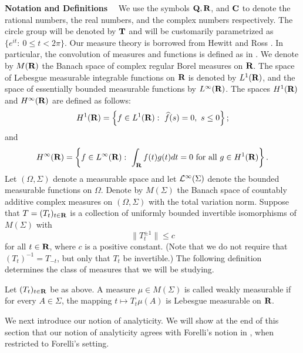 
\bigskip
\noindent
{\bf Notation and Definitions} \ \ We 
use the symbols $\Q, \R$, and $\C$ 
to denote the rational 
numbers, the real numbers, and the complex numbers respectively.  
The circle group will be denoted by $\T$ and will be 
customarily parametrized as $\{ e^{i t}:\ 0\leq t<2 \pi\}$.
Our measure theory is borrowed 
from Hewitt and Ross \cite{hr1}.  In particular, 
the convolution of measures and functions is defined as in
\cite[\S 20]{hr1}.  We denote by
$M(\R)$
the Banach space of complex regular Borel measures on $\R$.
The space of  
Lebesgue measurable integrable functions on $\R$ is denoted
by $L^1(\R)$, and the space of essentially 
bounded measurable functions by $L^\infty(\R)$. 
The spaces $H^1(\R)$ and $H^\infty(\R)$ are defined as follows:
$$H^1(\R)=\left\{
f\in L^1(\R):\ \widehat{f}(s)=0,\ s\leq 0
\right\};$$
and
$$H^\infty(\R)=\left\{
f\in L^\infty(\R): \ \int_\R f(t) g(t) dt=0\ {\rm for\ all\ }
g\in H^1(\R)
\right\}.$$
Let $(\Omega, \Sigma)$ denote a 
measurable space and let ${\cal L}^\infty(\Sigma)$ denote the 
bounded measurable functions on $\Omega$.  Denote 
by $M(\Sigma)$ the Banach space of countably additive 
complex measures on $(\Omega, \Sigma)$ with the 
total variation norm.  
Suppose that $T=(T_t)_{t\in\R}$ is a collection
of uniformly bounded 
invertible isomorphisms of $M(\Sigma)$ with
\begin{equation}
\|T_t^{\pm 1}\|\leq c
\label{uniformlybded}
\end{equation}
for all $t\in \R$, where $c$ is a positive constant.  
(Note that we do not require that $(T_t)^{-1}=T_{-t}$, but only
that $T_t$ be invertible.)
The following definition determines the class of measures 
that we will be studying.
\begin{weakmble}
Let $(T_t)_{t\in \R}$ be as above. 
A measure $\mu\in M(\Sigma)$ is 
called weakly measurable if 
for every $A\in \Sigma$, the mapping $t\mapsto T_t\mu(A)$ is 
Lebesgue measurable on $\R$.
\label{weakmble}
\end{weakmble}
We next introduce our notion of analyticity.  We will show at the 
end of this section that our notion of analyticity agrees
with Forelli's notion in \cite{forelli},
when restricted to Forelli's setting.  
